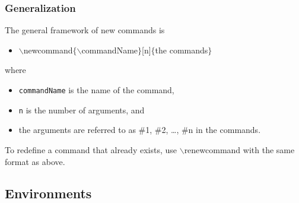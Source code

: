 \begin{frame}  \frametitle{Generalization}
The general framework of new commands is
\vspace{0.5mm} \\
\begin{itemize}
\item[] {\color{command}$\backslash$newcommand\color{braces}$\{${\color{command}$\backslash$commandName}$\}${\color{black}[n]}$\{${\color{highlight}the commands}$\}$}
\end{itemize}
\vspace{0.5mm}
where
\vspace{0.5mm} \\
\begin{itemize}
\item \texttt{commandName} is the name of the command,
\item \texttt{n} is the number of arguments, and
\item the arguments are referred to as \#1, \#2, \dots, \#n in {\color{highlight}the commands}.
\end{itemize}
\vspace{0.5mm}
To redefine a command that already exists, use {\color{command}$\backslash$renewcommand} with the same format as above.
\end{frame}

\subsection[Environments]{Environments}

